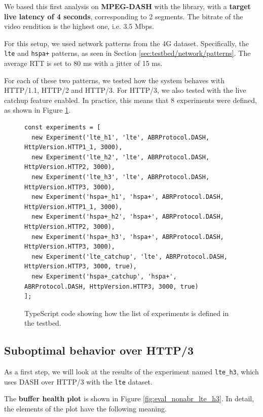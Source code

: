 We based this first analysis on \textbf{MPEG-DASH} with the \dashjs{} library, with a \textbf{target live latency of 4 seconds}, corresponding to 2 segments. The bitrate of the video rendition is the highest one, i.e. 3.5 Mbps.

For this setup, we used network patterns from the 4G dataset. Specifically, the \texttt{lte} and \texttt{hspa+} patterns, as seen in Section \ref{sec:testbed/network/patterns}. The average RTT is set to 80 ms with a jitter of 15 ms.

For each of these two patterns, we tested how the system behaves with HTTP/1.1, HTTP/2 and HTTP/3. For HTTP/3, we also tested with the live catchup feature enabled. In practice, this means that 8 experiments were defined, as shown in Figure \ref{fig:experiments1}.

\begin{figure}[h]
    \centering
    \begin{verbatim}
const experiments = [
  new Experiment('lte_h1', 'lte', ABRProtocol.DASH, HttpVersion.HTTP1_1, 3000),
  new Experiment('lte_h2', 'lte', ABRProtocol.DASH, HttpVersion.HTTP2, 3000),
  new Experiment('lte_h3', 'lte', ABRProtocol.DASH, HttpVersion.HTTP3, 3000),
  new Experiment('hspa+_h1', 'hspa+', ABRProtocol.DASH, HttpVersion.HTTP1_1, 3000),
  new Experiment('hspa+_h2', 'hspa+', ABRProtocol.DASH, HttpVersion.HTTP2, 3000),
  new Experiment('hspa+_h3', 'hspa+', ABRProtocol.DASH, HttpVersion.HTTP3, 3000),
  new Experiment('lte_catchup', 'lte', ABRProtocol.DASH, HttpVersion.HTTP3, 3000, true),
  new Experiment('hspa+_catchup', 'hspa+', ABRProtocol.DASH, HttpVersion.HTTP3, 3000, true)
];
    \end{verbatim}
    \caption{TypeScript code showing how the list of experiments is defined in the testbed.}
    \label{fig:experiments1}
\end{figure}

\subsection{Suboptimal behavior over HTTP/3}
\label{sec:eval/non-abr/h3-behavior}

As a first step, we will look at the results of the experiment named \texttt{lte\_h3}, which uses DASH over HTTP/3 with the \texttt{lte} dataset.

The \textbf{buffer health plot} is shown in Figure \ref{fig:eval_nonabr_lte_h3}. In detail, the elements of the plot have the following meaning.

